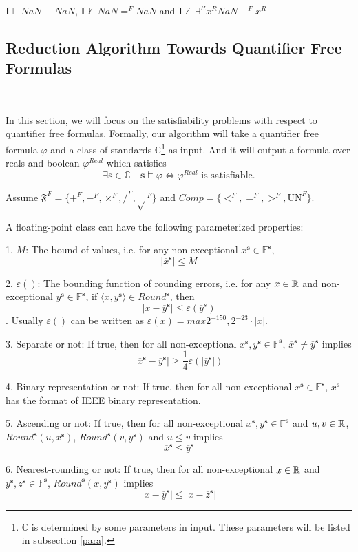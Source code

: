 \documentclass[12pt]{article}
\newcommand{\F}{\mathbb{F}}
\newcommand{\s}{\mathbf{s}}
\newcommand{\IEEE}{\mathbf{I}}
\newcommand{\OL}{\overline}
\begin{document}
\begin{example}
$\IEEE \vDash NaN \equiv NaN$, $\IEEE \not\vDash NaN =^F NaN$ and $\IEEE \not\vDash \exists^R x^R NaN \equiv^F x^R$
\end{example}

\subsection{Reduction Algorithm Towards Quantifier Free Formulas} \

In this section, we will focus on the satisfiability problems with respect to quantifier free formulas. Formally, our algorithm will take a quantifier free formula $\varphi$ and a class of standards $\mathbb{C}$\footnote{$\mathbb{C}$ is determined by some parameters in input. These parameters will be listed in subsection \ref{para}.} as input. And it will output a formula over reals and boolean $\varphi^{Real}$ which satisfies $$\exists \s \in \mathbb{C} \quad \s \vDash \varphi \iff \varphi^{Real} \text{ is satisfiable.}$$

Assume $\mathfrak{F}^F = \{+^F, -^F, \times^F, /^F, \sqrt{}^F\}$ and $Comp = \{<^F, =^F, >^F, \text{UN}^F \}$.

A floating-point class can have the following parameterized properties:

1. $M$: The bound of values, i.e. for any non-exceptional $x^\s \in \F^\s$, $$|\OL x^\s| \leq M$$

2. $\varepsilon()$: The bounding function of rounding errors, i.e. for any $x \in \mathbb{R}$ and non-exceptional $y^\s\in \F^\s$, if $\langle x, y^\s \rangle \in Round^\s$, then $$|x - \OL y^\s| \leq \varepsilon(\OL y^s)$$. Usually $\varepsilon()$ can be written as $\varepsilon(x) = max{2^{-150}, 2^{-23} \cdot |x|}$.

3. Separate or not: If true, then for all non-exceptional $x^\s, y^\s \in \F^\s$, $\OL x^\s \neq \OL y^\s$ implies $$\left| \OL x^\s - \OL y^\s \right| \geq \frac{1}{4} \varepsilon(\left|\OL y^\s\right|)$$

4. Binary representation or not: If true, then for all non-exceptional $x^\s \in \F^\s$, $\OL x^\s$ has the format of IEEE binary representation.

5. Ascending or not: If true, then for all non-exceptional $x^\s, y^\s \in \F^\s$ and $u,v \in \mathbb{R}$, $Round^\s(u, x^\s)$, $Round^\s(v, y ^\s)$ and $u \leq v$ implies $$ \OL x^\s \leq \OL y ^\s$$

6. Nearest-rounding or not: If true, then for all non-exceptional $x \in \mathbb{R}$ and $y^\s, z^\s\in \F^\s$, $Round^\s(x, y^\s)$ implies $$ \left| x - \OL y ^\s \right| \leq \left| x - \OL z ^\s \right|$$
\end{document}
